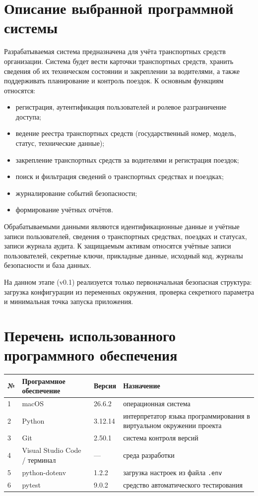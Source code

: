 \documentclass[12pt,a4paper]{article}
\begin{document}
\section{Описание выбранной программной системы}

Разрабатываемая система предназначена для учёта транспортных средств организации. Система будет вести карточки транспортных средств, хранить сведения об их техническом состоянии и закреплении за водителями, а также поддерживать планирование и контроль поездок. К основным функциям относятся:

\begin{itemize}
\item регистрация, аутентификация пользователей и ролевое разграничение доступа;
\item ведение реестра транспортных средств (государственный номер, модель, статус, технические данные);
\item закрепление транспортных средств за водителями и регистрация поездок;
\item поиск и фильтрация сведений о транспортных средствах и поездках;
\item журналирование событий безопасности;
\item формирование учётных отчётов.
\end{itemize}
Обрабатываемыми данными являются идентификационные данные и учётные записи пользователей, сведения о транспортных средствах, поездках и статусах, записи журнала аудита. К защищаемым активам относятся учётные записи пользователей, секретные ключи, прикладные данные, исходный код, журналы безопасности и база данных.

На данном этапе (v0.1) реализуется только первоначальная безопасная структура: загрузка конфигурации из переменных окружения, проверка секретного параметра и минимальная точка запуска приложения.

\section{Перечень использованного программного обеспечения}

\small\begin{tabularx}{\linewidth}{|p{0.8cm}|p{3.8cm}|p{1.6cm}|X|}
\hline
№ & Программное обеспечение & Версия & Назначение \\ \hline
1 & macOS & 26.6.2 & операционная система \\ \hline
2 & Python & 3.12.14 & интерпретатор языка программирования в виртуальном окружении проекта \\ \hline
3 & Git & 2.50.1 & система контроля версий \\ \hline
4 & Visual Studio Code / терминал & — & среда разработки \\ \hline
5 & python-dotenv & 1.2.2 & загрузка настроек из файла \texttt{.\allowbreak{}env} \\ \hline
6 & pytest & 9.0.2 & средство автоматического тестирования \\ \hline
\end{tabularx}\normalsize
\end{document}
